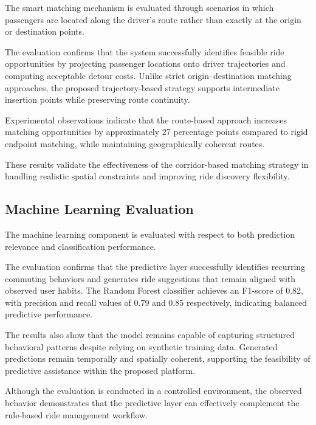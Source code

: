 The smart matching mechanism is evaluated through scenarios in which passengers are located along the driver's route rather than exactly at the origin or destination points.

The evaluation confirms that the system successfully identifies feasible ride opportunities by projecting passenger locations onto driver trajectories and computing acceptable detour costs. Unlike strict origin--destination matching approaches, the proposed trajectory-based strategy supports intermediate insertion points while preserving route continuity.

Experimental observations indicate that the route-based approach increases matching opportunities by approximately 27 percentage points compared to rigid endpoint matching, while maintaining geographically coherent routes.

These results validate the effectiveness of the corridor-based matching strategy in handling realistic spatial constraints and improving ride discovery flexibility.


\subsection{Machine Learning Evaluation}

The machine learning component is evaluated with respect to both prediction relevance and classification performance.

The evaluation confirms that the predictive layer successfully identifies recurring commuting behaviors and generates ride suggestions that remain aligned with observed user habits. The Random Forest classifier achieves an F1-score of 0.82, with precision and recall values of 0.79 and 0.85 respectively, indicating balanced predictive performance.

The results also show that the model remains capable of capturing structured behavioral patterns despite relying on synthetic training data. Generated predictions remain temporally and spatially coherent, supporting the feasibility of predictive assistance within the proposed platform.

Although the evaluation is conducted in a controlled environment, the observed behavior demonstrates that the predictive layer can effectively complement the rule-based ride management workflow.



